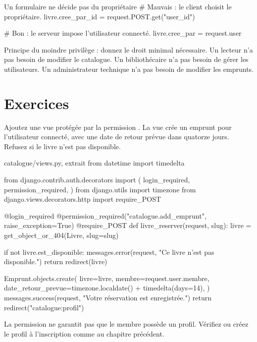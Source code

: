 \begin{codebox}[python]{Un formulaire ne décide pas du propriétaire}
# Mauvais : le client choisit le propriétaire.
livre.cree_par_id = request.POST.get("user_id")

# Bon : le serveur impose l'utilisateur connecté.
livre.cree_par = request.user
\end{codebox}

\begin{bonne}
Principe du moindre privilège : donnez le droit minimal nécessaire. Un lecteur n'a
pas besoin de modifier le catalogue. Un bibliothécaire n'a pas besoin de gérer les
utilisateurs. Un administrateur technique n'a pas besoin de modifier les emprunts.
\end{bonne}

\section{Exercices}

\begin{exercice}
Ajoutez une vue  protégée par la permission
. La vue crée un emprunt pour l'utilisateur connecté,
avec une date de retour prévue dans quatorze jours. Refusez si le livre n'est pas
disponible.
\end{exercice}

\begin{correction}
\begin{codebox}[python]{catalogue/views.py, extrait}
from datetime import timedelta

from django.contrib.auth.decorators import (
    login_required,
    permission_required,
)
from django.utils import timezone
from django.views.decorators.http import require_POST


@login_required
@permission_required("catalogue.add_emprunt", raise_exception=True)
@require_POST
def livre_reserver(request, slug):
    livre = get_object_or_404(Livre, slug=slug)

    if not livre.est_disponible:
        messages.error(request, "Ce livre n'est pas disponible.")
        return redirect(livre)

    Emprunt.objects.create(
        livre=livre,
        membre=request.user.membre,
        date_retour_prevue=timezone.localdate() + timedelta(days=14),
    )
    messages.success(request, "Votre réservation est enregistrée.")
    return redirect("catalogue:profil")
\end{codebox}

\begin{note}
La permission  ne garantit pas que le membre possède un profil.
Vérifiez  ou créez le profil à l'inscription
comme au chapitre précédent.
\end{note}
\end{correction}

